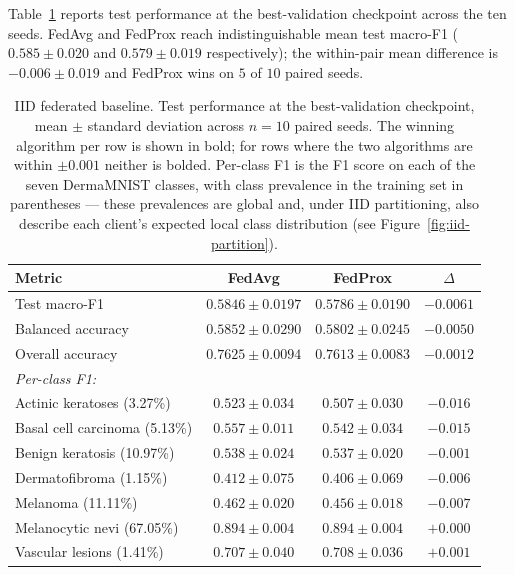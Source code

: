 \documentclass[11pt,a4paper]{report}
\begin{document}
Table~\ref{tab:iid-results} reports test performance at the
best-validation checkpoint across the ten seeds. FedAvg and
FedProx reach indistinguishable mean test macro-F1
($0.585 \pm 0.020$ and $0.579 \pm 0.019$ respectively); the
within-pair mean difference is $-0.006 \pm 0.019$ and FedProx
wins on $5$ of $10$ paired seeds.

\begin{table}[!htbp]
\centering
\caption{IID federated baseline. Test performance at the
best-validation checkpoint, mean $\pm$ standard deviation across
$n = 10$ paired seeds. The winning algorithm per row is shown in
bold; for rows where the two algorithms are within $\pm 0.001$
neither is bolded. Per-class F1 is the F1 score on each of the
seven DermaMNIST classes, with class prevalence in the training
set in parentheses --- these prevalences are global and, under
IID partitioning, also describe each client's expected local
class distribution (see Figure~\ref{fig:iid-partition}).}
\label{tab:iid-results}
\small
\begin{tabular}{lccc}
\toprule
Metric & FedAvg & FedProx & $\Delta$ \\
\midrule
Test macro-F1                 & $\mathbf{0.5846 \pm 0.0197}$ & $0.5786 \pm 0.0190$ & $-0.0061$ \\
Balanced accuracy             & $\mathbf{0.5852 \pm 0.0290}$ & $0.5802 \pm 0.0245$ & $-0.0050$ \\
Overall accuracy              & $0.7625 \pm 0.0094$          & $0.7613 \pm 0.0083$ & $-0.0012$ \\
\midrule
\multicolumn{4}{l}{\textit{Per-class F1:}} \\
\quad Actinic keratoses (3.27\%)   & $\mathbf{0.523 \pm 0.034}$ & $0.507 \pm 0.030$ & $-0.016$ \\
\quad Basal cell carcinoma (5.13\%)& $\mathbf{0.557 \pm 0.011}$ & $0.542 \pm 0.034$ & $-0.015$ \\
\quad Benign keratosis (10.97\%)   & $0.538 \pm 0.024$          & $0.537 \pm 0.020$ & $-0.001$ \\
\quad Dermatofibroma (1.15\%)      & $\mathbf{0.412 \pm 0.075}$ & $0.406 \pm 0.069$ & $-0.006$ \\
\quad Melanoma (11.11\%)           & $\mathbf{0.462 \pm 0.020}$ & $0.456 \pm 0.018$ & $-0.007$ \\
\quad Melanocytic nevi (67.05\%)   & $0.894 \pm 0.004$          & $0.894 \pm 0.004$ & $+0.000$ \\
\quad Vascular lesions (1.41\%)    & $0.707 \pm 0.040$          & $0.708 \pm 0.036$ & $+0.001$ \\
\bottomrule
\end{tabular}
\end{table}
\end{document}
